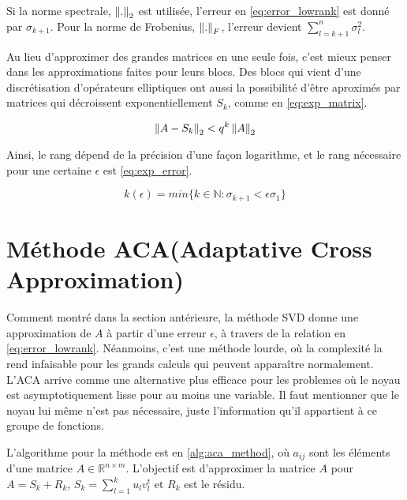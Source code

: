 Si la norme spectrale, $\left\lVert.\right\rVert_{2} $ est utilisée, l'erreur en \ref{eq:error_lowrank} est donné par $\sigma_{k+1}$. Pour la norme de Frobenius, $\left\lVert.\right\rVert_{F}$, l'erreur devient $\sum^{n}_{l=k+1} \sigma^{2}_{l}$.

Au lieu d'approximer des grandes matrices en une seule fois, c'est mieux penser dans les approximations faites pour leurs blocs. Des blocs qui vient d'une discrétisation d'opérateurs elliptiques  ont aussi la possibilité d'être aproximés par matrices qui décroissent exponentiellement  $S_{k}$, comme en \ref{eq:exp_matrix}.

\begin{equation}\label{eq:exp_matrix}
    \left\lVert A-S_{k}\right\rVert_{2} < q^{k}\left\lVert A\right\rVert_{2}
\end{equation}

Ainsi, le rang dépend de la précision d'une façon logarithme, et le rang nécessaire pour une certaine $\epsilon$ est \ref{eq:exp_error}.

\begin{equation}\label{eq:exp_error}
    k(\epsilon) = min\{ k \in \mathbb{N} : \sigma_{k+1} < \epsilon\sigma_{1}\}
\end{equation}

\section{Méthode ACA(Adaptative Cross Approximation)}

Comment montré dans la section antérieure, la méthode SVD donne une approximation de $A$ à partir d'une erreur $\epsilon$, à travers de la relation en \ref{eq:error_lowrank}. Néanmoins, c'est une méthode lourde, où la complexité la rend infaisable pour les grands calculs qui peuvent apparaître normalement. L'ACA arrive comme une alternative plus efficace pour les problemes où le noyau est asymptotiquement lisse pour au moins une variable. Il faut mentionner que le noyau lui même n'est pas nécessaire, juste l'information qu'il appartient à ce groupe de fonctions.


L'algorithme pour la méthode est en \ref{alg:aca_method}, où $a_{ij}$ sont les éléments d'une matrice $A \in \mathbb{R}^{n\times m}$. L'objectif est d'approximer la matrice $A$ pour $A=S_{k} + R_{k}$, $S_{k} = \sum_{l=1}^{k} u_{l}v_{l}^{t}$ et $R_{k}$ est le résidu.



